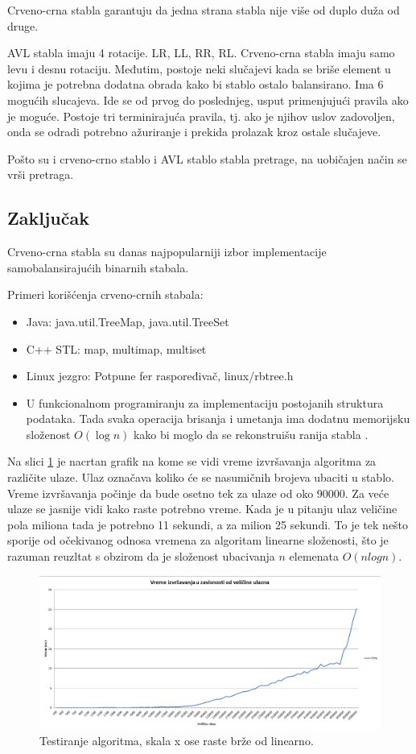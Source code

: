 \documentclass[a4paper]{article}
\begin{document}
    Crveno-crna stabla garantuju da jedna strana stabla nije više od duplo duža od druge.

    AVL stabla imaju 4 rotacije. LR, LL, RR, RL.
    Crveno-crna stabla imaju samo levu i desnu rotaciju. Međutim, postoje neki slučajevi kada se briše element u kojima je potrebna dodatna obrada
    kako bi stablo ostalo balansirano.
    Ima 6 mogućih slucajeva. Ide se od prvog do poslednjeg, usput primenjujući pravila ako je moguće. Postoje tri terminirajuća pravila, tj. 
    ako je njihov uslov zadovoljen, onda se odradi potrebno ažuriranje i prekida prolazak kroz ostale slučajeve.
    
    Pošto su i crveno-crno stablo i AVL stablo stabla pretrage, na uobičajen način se vrši pretraga.

\subsection{Zaključak}
Crveno-crna stabla su danas najpopularniji izbor implementacije samobalansirajućih binarnih stabala.

Primeri korišćenja crveno-crnih stabala:
\begin{itemize}
    \item  Java: java.util.TreeMap, java.util.TreeSet
    \item C++ STL: map, multimap, multiset \cite{gcc}
    \item Linux jezgro: Potpune fer raspoređivač, linux/rbtree.h
    \item U funkcionalnom programiranju za implementaciju postojanih struktura podataka. Tada svaka operacija brisanja i umetanja ima dodatnu memorijsku složenost $O(\log n)$ kako bi moglo da se rekonstruišu ranija stabla \cite{persistent}.
\end{itemize}

Na slici \ref{fig:chart} je nacrtan grafik na kome se vidi vreme  izvršavanja algoritma za različite ulaze.
Ulaz označava koliko će se nasumičnih brojeva ubaciti u stablo.
Vreme izvršavanja počinje da bude osetno tek za ulaze od oko 90000.
Za veće ulaze se jasnije vidi kako raste potrebno vreme. Kada je u pitanju
ulaz veličine pola miliona tada je potrebno 11 sekundi, a za milion 25 sekundi.
To je tek nešto sporije od očekivanog odnosa vremena za algoritam linearne složenosti, što je 
razuman reuzltat s obzirom da je složenost ubacivanja $n$ elemenata $O(n logn)$.

\begin{figure}
    \includegraphics[width=\textwidth]{chart.png}
    \caption{Testiranje algoritma, skala x ose raste brže od linearno.}
    \label{fig:chart}
\end{figure}

\appendix
 

\end{document}
